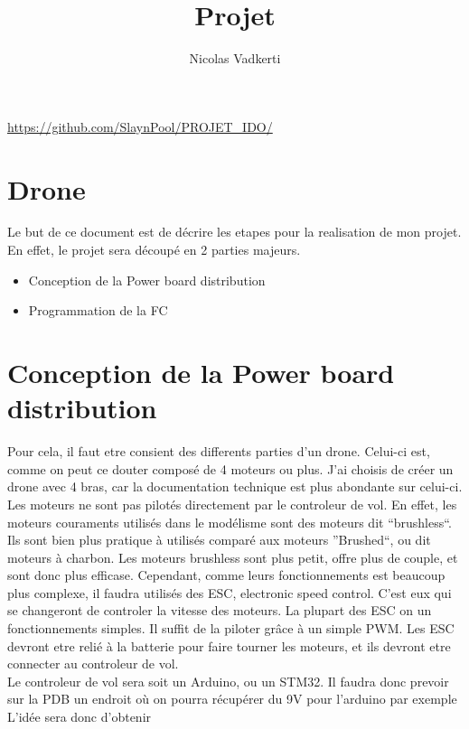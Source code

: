 \documentclass[10pt,a4paper]{article}
\title{Projet}
\author{Nicolas Vadkerti}
\begin{document}
\maketitle


\url{https://github.com/SlaynPool/PROJET_IDO/}

\section{Drone}
Le but de ce document est de décrire les etapes pour la realisation de mon projet.
En effet, le projet sera découpé en 2 parties majeurs.
\begin{itemize}
 \item Conception de la Power board distribution
 \item Programmation de la FC
 
\end{itemize}
\section{Conception de la Power board distribution}
Pour cela, il faut etre consient des differents parties d'un drone.
Celui-ci est, comme on peut ce douter composé de 4 moteurs ou plus. J'ai choisis de créer un drone avec 4 bras, car la documentation technique est plus abondante sur celui-ci. \\
Les moteurs ne sont pas pilotés directement par le controleur de vol. En effet, les moteurs couraments utilisés dans le modélisme sont des moteurs dit ``brushless``. Ils sont bien plus pratique à utilisés comparé aux moteurs ''Brushed``, ou dit moteurs à charbon. Les moteurs brushless sont plus petit, offre plus de couple, et sont donc plus efficase. Cependant, comme leurs fonctionnements est beaucoup plus complexe, il faudra utilisés des ESC, electronic speed control. C'est eux qui se changeront de controler la vitesse des moteurs. La plupart des ESC on un fonctionnements simples. Il suffit de la piloter grâce à un simple PWM.
Les ESC devront etre relié à la batterie pour faire tourner les moteurs, et ils devront etre connecter au controleur de vol.\\
Le controleur de vol sera soit un Arduino, ou un STM32. Il faudra donc prevoir sur la PDB un endroit où on pourra récupérer du 9V pour l'arduino par exemple
L'idée sera donc d'obtenir 


 
 
 
 
\end{document}
